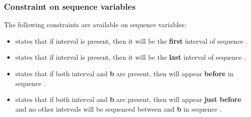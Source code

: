 

\begin{frame} \frametitle{Constraint on sequence variables}
\pause

The following constraints are available on sequence variables:\pause
\begin{itemize}[<+->]
\item {} states that if interval  is present, then it will be the \textbf{first} interval of sequence .
\item {} states that if interval  is present, then it will be the \textbf{last} interval of sequence .
\item {} states that if both interval  and \textbf{b} are present, then  will appear \textbf{before}  in sequence .
\item {} states that if both interval  and \textbf{b} are present, then  will appear \textbf{just before}  and no other intervals will be sequenced between  and \textbf{b} in sequence .
\end{itemize}

\end{frame}


